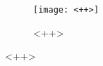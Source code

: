 \begin{figure}[htbp]
  \centering
  \texttt{[image: <++>]}
  \caption{<++>}
  \label{fig:<++>}
\end{figure}
<++>
